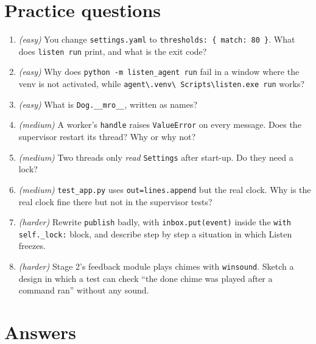 \documentclass[11pt,a4paper]{article}
\begin{document}
\section{Practice questions}
\begin{exercise}
\begin{enumerate}
  \item \emph{(easy)} You change \texttt{settings.yaml} to \texttt{thresholds: \{ match: 80 \}}.
        What does \texttt{listen run} print, and what is the exit code?
  \item \emph{(easy)} Why does \texttt{python -m listen\_agent run} fail in a window where the
        venv is not activated, while \texttt{agent\textbackslash .venv\textbackslash
        Scripts\textbackslash listen.exe run} works?
  \item \emph{(easy)} What is \texttt{Dog.\_\_mro\_\_}, written as names?
  \item \emph{(medium)} A worker's \texttt{handle} raises \texttt{ValueError} on every message.
        Does the supervisor restart its thread? Why or why not?
  \item \emph{(medium)} Two threads only \emph{read} \texttt{Settings} after start-up. Do they
        need a lock?
  \item \emph{(medium)} \texttt{test\_app.py} uses \texttt{out=lines.append} but the real clock.
        Why is the real clock fine there but not in the supervisor tests?
  \item \emph{(harder)} Rewrite \texttt{publish} badly, with \texttt{inbox.put(event)} inside the
        \texttt{with self.\_lock:} block, and describe step by step a situation in which Listen
        freezes.
  \item \emph{(harder)} Stage 2's feedback module plays chimes with \texttt{winsound}. Sketch a
        design in which a test can check ``the done chime was played after a command ran''
        without any sound.
\end{enumerate}
\end{exercise}

\section{Answers}\label{sec:answers}
\end{document}
